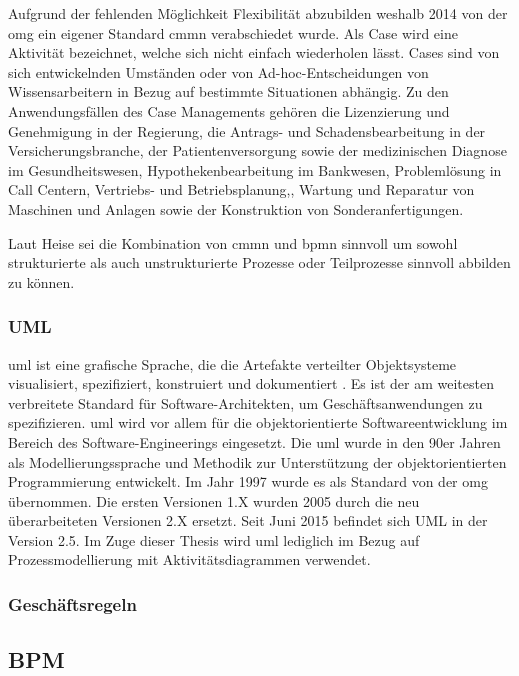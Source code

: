 \documentclass[a4paper, 12pt, twoside, headsepline=true]{scrartcl} %
\begin{document}
Aufgrund der fehlenden Möglichkeit Flexibilität abzubilden weshalb 2014 von der \ac{omg} ein eigener Standard \ac{cmmn} verabschiedet wurde. Als Case wird eine Aktivität bezeichnet, welche sich nicht einfach wiederholen lässt. Cases sind  von sich entwickelnden Umständen oder von Ad-hoc-Entscheidungen von Wissensarbeitern in Bezug auf  bestimmte Situationen abhängig. Zu den Anwendungsfällen des Case Managements gehören die Lizenzierung und Genehmigung in der Regierung, die Antrags- und Schadensbearbeitung in der Versicherungsbranche, der Patientenversorgung sowie der medizinischen Diagnose im Gesundheitswesen,
Hypothekenbearbeitung im Bankwesen, Problemlösung in Call Centern, Vertriebs- und Betriebsplanung,, Wartung und Reparatur von Maschinen und Anlagen sowie der Konstruktion von Sonderanfertigungen.

Laut Heise sei die Kombination von \ac{cmmn} und \ac{bpmn} sinnvoll um sowohl strukturierte als auch unstrukturierte Prozesse oder Teilprozesse sinnvoll abbilden zu können.

\subsubsection{UML}

 \ac{uml} ist eine grafische Sprache, die die Artefakte verteilter Objektsysteme visualisiert, spezifiziert, konstruiert und dokumentiert \cite{Kleuker}. Es ist der am weitesten verbreitete Standard für Software-Architekten, um Geschäftsanwendungen zu spezifizieren. \ac{uml} wird vor allem für die objektorientierte Softwareentwicklung im Bereich des Software-Engineerings eingesetzt.
Die \ac{uml} wurde in den 90er Jahren als Modellierungssprache und Methodik zur Unterstützung der objektorientierten Programmierung entwickelt. Im Jahr 1997 wurde es als Standard von der \ac{omg} übernommen. Die ersten Versionen 1.X wurden 2005 durch die neu überarbeiteten Versionen 2.X ersetzt. Seit Juni 2015 befindet sich UML in der Version 2.5. Im Zuge dieser Thesis wird \ac{uml} lediglich im Bezug auf Prozessmodellierung mit Aktivitätsdiagrammen verwendet. 


\subsubsection{Geschäftsregeln}

\subsection{BPM}
\end{document}

